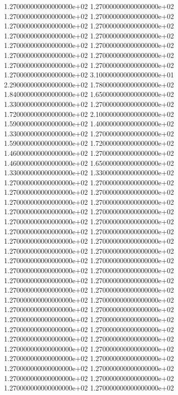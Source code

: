 1.270000000000000000e+02 1.270000000000000000e+02 1.270000000000000000e+02 1.270000000000000000e+02 1.270000000000000000e+02 1.270000000000000000e+02 1.270000000000000000e+02 1.270000000000000000e+02 1.270000000000000000e+02 1.270000000000000000e+02 1.270000000000000000e+02 1.270000000000000000e+02 1.270000000000000000e+02 1.270000000000000000e+02 1.270000000000000000e+02 3.100000000000000000e+01 2.290000000000000000e+02 1.780000000000000000e+02 1.840000000000000000e+02 1.650000000000000000e+02 1.330000000000000000e+02 1.270000000000000000e+02 1.720000000000000000e+02 2.100000000000000000e+02 1.590000000000000000e+02 1.400000000000000000e+02 1.330000000000000000e+02 1.270000000000000000e+02 1.590000000000000000e+02 1.720000000000000000e+02 1.460000000000000000e+02 1.270000000000000000e+02 1.460000000000000000e+02 1.650000000000000000e+02 1.330000000000000000e+02 1.330000000000000000e+02 1.270000000000000000e+02 1.270000000000000000e+02 1.270000000000000000e+02 1.270000000000000000e+02 1.270000000000000000e+02 1.270000000000000000e+02 1.270000000000000000e+02 1.270000000000000000e+02 1.270000000000000000e+02 1.270000000000000000e+02 1.270000000000000000e+02 1.270000000000000000e+02 1.270000000000000000e+02 1.270000000000000000e+02 1.270000000000000000e+02 1.270000000000000000e+02 1.270000000000000000e+02 1.270000000000000000e+02 1.270000000000000000e+02 1.270000000000000000e+02 1.270000000000000000e+02 1.270000000000000000e+02 1.270000000000000000e+02 1.270000000000000000e+02 1.270000000000000000e+02 1.270000000000000000e+02 1.270000000000000000e+02 1.270000000000000000e+02 1.270000000000000000e+02 1.270000000000000000e+02 1.270000000000000000e+02 1.270000000000000000e+02 1.270000000000000000e+02 1.270000000000000000e+02 1.270000000000000000e+02 1.270000000000000000e+02 1.270000000000000000e+02 1.270000000000000000e+02 1.270000000000000000e+02 1.270000000000000000e+02 1.270000000000000000e+02 1.270000000000000000e+02 1.270000000000000000e+02 1.270000000000000000e+02
